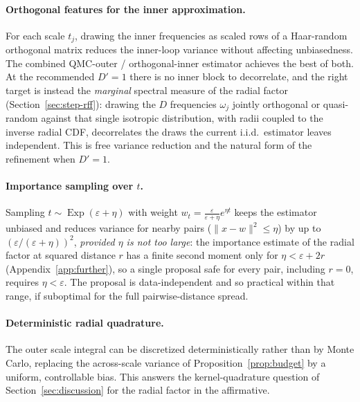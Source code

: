 \documentclass{article}
\DeclareMathOperator{\Exp}{Exp}
\begin{document}
\paragraph{Orthogonal features for the inner approximation.} For each scale $t_j$, drawing the inner frequencies as scaled rows of a Haar-random orthogonal matrix \citep{yu2016orthogonal} reduces the inner-loop variance without affecting unbiasedness. The combined QMC-outer / orthogonal-inner estimator achieves the best of both. At the recommended $D'=1$ there is no inner block to decorrelate, and the right target is instead the \emph{marginal} spectral measure of the radial factor (Section~\ref{sec:step-rff}): drawing the $D$ frequencies $\omega_j$ jointly orthogonal or quasi-random against that single isotropic distribution, with radii coupled to the inverse radial CDF, decorrelates the draws the current i.i.d.\ estimator leaves independent. This is free variance reduction and the natural form of the refinement when $D'=1$.

\paragraph{Importance sampling over $t$.} Sampling $t\sim\Exp(\varepsilon+\eta)$ with weight $w_t=\frac{\varepsilon}{\varepsilon+\eta}e^{\eta t}$ keeps the estimator unbiased and reduces variance for nearby pairs ($\|x-w\|^2\le\eta$) by up to $(\varepsilon/(\varepsilon+\eta))^2$, \emph{provided $\eta$ is not too large}: the importance estimate of the radial factor at squared distance $r$ has a finite second moment only for $\eta<\varepsilon+2r$ (Appendix~\ref{app:further}), so a single proposal safe for every pair, including $r=0$, requires $\eta<\varepsilon$. The proposal is data-independent and so practical within that range, if suboptimal for the full pairwise-distance spread.

\paragraph{Deterministic radial quadrature.} The outer scale integral can be discretized deterministically rather than by Monte Carlo, replacing the across-scale variance of Proposition~\ref{prop:budget} by a uniform, controllable bias. This answers the kernel-quadrature question of Section~\ref{sec:discussion} for the radial factor in the affirmative.
\end{document}
